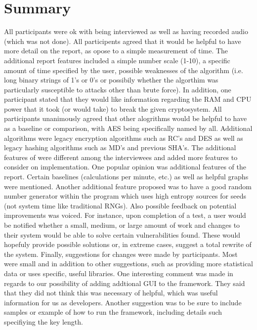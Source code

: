 \section{Summary}

All participants were ok with being interviewed as well as
having recorded audio (which was not done). All participents
agreed that it would be helpful to have more detail on the
report, as opose to a simple measurement of time. The
additional report features included a simple number scale
(1-10), a specific amount of time specified by the user,
possible weaknesses of the algorithm (i.e. long binary
strings of 1's or 0's or possibily whether the algorthim was
particularly susceptible to attacks other than brute force).
In addition, one participant stated that they would like
information regarding the RAM and CPU power that it took (or
would take) to break the given cryptosystem. All
participants unanimously agreed that other alogrithms would
be helpful to have as a baseline or comparison, with AES
being specifically named by all. Additional algorithms were
legacy encryption algorithms such as RC's and DES as well as
legacy hashing algorithms such as MD's and previous SHA's.
The additional features of \cry{} were different among the
interviewees and added more features to consider on
implementation. One popular opinion was additional features
of the report. Certain baselines (calculations per minute,
etc.) as well as helpful graphs were mentioned. Another
additional feature proposed was to have a good random number
generator within the program which uses high entropy sources
for seeds (not system time like traditional RNGs). Also
possible feedback on potential improvements was voiced. For
instance, upon completion of a test, a user would be
notified whether a small, medium, or large amount of work
and changes to their system would be able to solve certain
vulnerabilities found. These would hopefuly provide possible
solutions or, in extreme cases, suggest a total rewrite of
the system. Finally, suggestions for changes were made by
participants. Most were small and in addition to other
suggestions, such as providing more statistical data or uses
specific, useful libraries. One interesting comment was made
in regards to our possibility of adding addtional GUI to the
framework. They said that they did not think this was
necessary of helpful, which was useful information for us as
developers. Another suggestion was to be sure to include
samples or example of how to run the framework, including
details such specifiying the key length.


